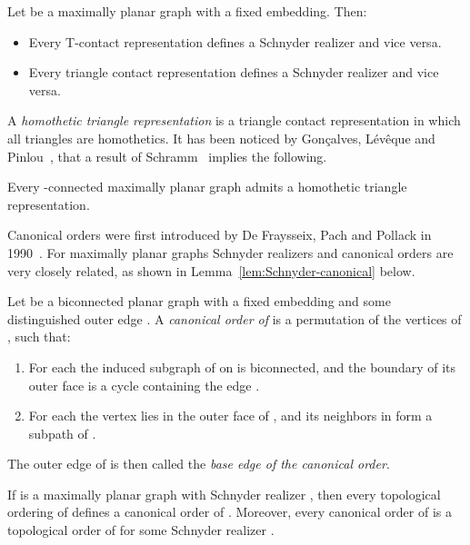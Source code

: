 \documentclass{llncs}
\begin{document}
\begin{theorem}
 Let  be a maximally planar graph with a fixed embedding. Then:
 \begin{itemize}
  \item Every T-contact representation defines a Schnyder realizer and vice versa.
  \item Every triangle contact representation defines a Schnyder realizer and vice versa.
 \end{itemize} 
\end{theorem}

A \emph{homothetic triangle representation} is a triangle contact representation in which all triangles are homothetics. It has been noticed by Gon{\c{c}}alves, L{\'e}v{\^e}que and Pinlou~\cite{gonccalves2012triangle}, that a result of Schramm~\cite{schramm2007combinatorically} implies the following.

\begin{theorem}\label{thm:homothetic-triangles}
 Every -connected maximally planar graph admits a homothetic triangle representation.
\end{theorem}

Canonical orders were first introduced by De Fraysseix, Pach and Pollack in 1990~\cite{fpp-hdpgg-90}. For maximally planar graphs Schnyder realizers and canonical orders are very closely related, as shown in Lemma~\ref{lem:Schnyder-canonical} below.

\begin{definition}\label{def:canonical-order}
 Let  be a biconnected planar graph with a fixed embedding and some distinguished outer edge . A \emph{canonical order of } is a permutation  of the vertices of , such that:
 \begin{enumerate}[label =(\roman*)]
  \item For each  the induced subgraph  of  on  is biconnected, and the boundary of its outer face is a cycle  containing the edge .
  \item For each  the vertex  lies in the outer face of , and its neighbors in  form a subpath of .
 \end{enumerate}
 The outer edge  of  is then called the \emph{base edge of the canonical order}.
\end{definition}

\begin{lemma}\label{lem:Schnyder-canonical}
 If  is a maximally planar graph with Schnyder realizer , then every topological ordering of  defines a canonical order of . Moreover, every canonical order of  is a topological order of  for some Schnyder realizer .
\end{lemma}
\end{document}
